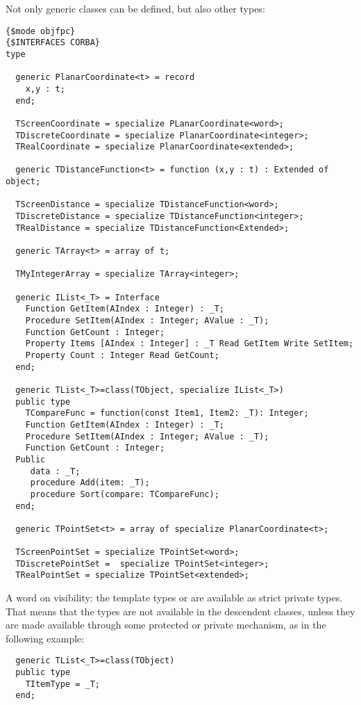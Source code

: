 Not only generic classes can be defined, but also other types:
\begin{verbatim}
{$mode objfpc}
{$INTERFACES CORBA}
type

  generic PlanarCoordinate<t> = record
    x,y : t;
  end;

  TScreenCoordinate = specialize PLanarCoordinate<word>;
  TDiscreteCoordinate = specialize PlanarCoordinate<integer>;
  TRealCoordinate = specialize PlanarCoordinate<extended>;

  generic TDistanceFunction<t> = function (x,y : t) : Extended of object;

  TScreenDistance = specialize TDistanceFunction<word>;
  TDiscreteDistance = specialize TDistanceFunction<integer>;
  TRealDistance = specialize TDistanceFunction<Extended>;

  generic TArray<t> = array of t;

  TMyIntegerArray = specialize TArray<integer>;

  generic IList<_T> = Interface
    Function GetItem(AIndex : Integer) : _T;
    Procedure SetItem(AIndex : Integer; AValue : _T);
    Function GetCount : Integer;
    Property Items [AIndex : Integer] : _T Read GetItem Write SetItem;
    Property Count : Integer Read GetCount;
  end;

  generic TList<_T>=class(TObject, specialize IList<_T>)
  public type
    TCompareFunc = function(const Item1, Item2: _T): Integer;
    Function GetItem(AIndex : Integer) : _T;
    Procedure SetItem(AIndex : Integer; AValue : _T);
    Function GetCount : Integer;
  Public
     data : _T;
     procedure Add(item: _T);
     procedure Sort(compare: TCompareFunc);
  end;

  generic TPointSet<t> = array of specialize PlanarCoordinate<t>;

  TScreenPointSet = specialize TPointSet<word>;
  TDiscretePointSet =  specialize TPointSet<integer>;
  TRealPointSet = specialize TPointSet<extended>;
\end{verbatim}

\begin{remark}
A word on visibility: the template types  or  are available as strict private types.
That means that the types are not available in the descendent classes, unless they are made available
through some protected or private mechanism, as in the following example:
\begin{verbatim}
  generic TList<_T>=class(TObject)
  public type
    TItemType = _T;
  end;
\end{verbatim}
\end{remark}

